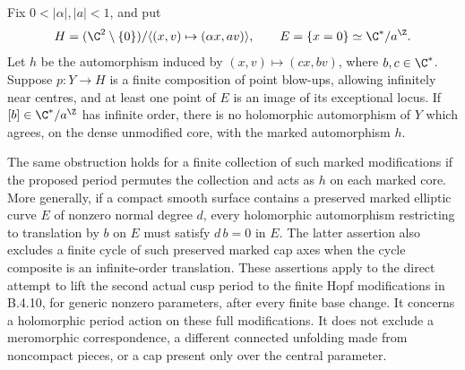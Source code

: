 \begin{proposition}
Fix $0<|\alpha|,|a|<1$, and put
\[
 H=(\C^2\setminus\{0\})/
       \langle(x,v)\mapsto(\alpha x,av)\rangle,
       \qquad E=\{x=0\}\simeq\C^*/a^\Z.
\]
Let $h$ be the automorphism induced by
$(x,v)\mapsto(c x,bv)$, where $b,c\in\C^*$.
Suppose $p:Y\to H$ is a finite composition of point blow-ups,
allowing infinitely near centres, and at least one point of $E$
is an image of its exceptional locus. If $[b]\in\C^*/a^\Z$ has
infinite order, there is no holomorphic automorphism of $Y$
which agrees, on the dense unmodified core, with the marked
automorphism $h$.

The same obstruction holds for a finite collection of such marked
modifications if the proposed period permutes the collection and
acts as $h$ on each marked core.
More generally, if a compact smooth surface contains a preserved
marked elliptic curve $E$ of nonzero normal degree $d$, every
holomorphic automorphism restricting to translation by $b$ on $E$
must satisfy $d\,b=0$ in $E$.
The latter assertion also excludes a finite cycle of such preserved
marked cap axes when the cycle composite is an infinite-order
translation. These assertions apply to the direct attempt
to lift the second actual cusp period to the finite Hopf
modifications in B.4.10, for generic nonzero parameters, after every
finite base change. It concerns a holomorphic period action on
these full modifications. It does not exclude a meromorphic
correspondence, a different connected unfolding made from
noncompact pieces, or a cap present only over the central parameter.
\end{proposition}
